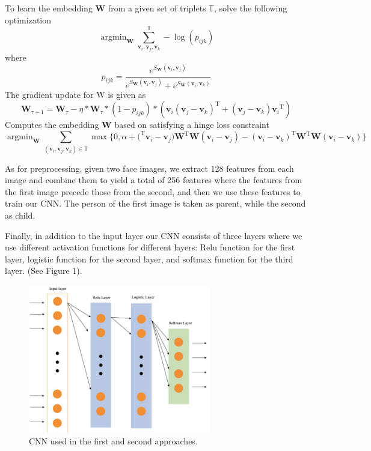 \documentclass{article}
\newcommand{\vect}[1]{\mathbf{#1}}
\newcommand{\argmin}{\mathop{\mathrm{argmin}}}
\newcommand{\trans}[1]{{#1}^\mathrm{T}}
\begin{document}
To learn the embedding $\vect{W}$ from a given set of triplets $\mathbb{T}$, solve the following optimization
\[
\argmin_\vect{W} \sum^\mathbb{T}_{\vect{v}_i, \vect{v}_j, \vect{v}_k} -\log(p_{ijk})
\]
where
\[
p_{ijk} = \frac{e^{S_\vect{W}(\vect{v}_i, \vect{v}_j)}}{e^{S_\vect{W}(\vect{v}_i, \vect{v}_j)} + e^{S_\vect{W}(\vect{v}_i, \vect{v}_k)}}
\]
The gradient update for W is given as
\[
\vect{W}_{\tau + 1} = \vect{W}_\tau - \eta \ast \vect{W}_\tau \ast (1 - p_{ijk}) \ast (\vect{v}_i \trans{(\vect{v}_j - \vect{v}_k)} + (\vect{v}_j - \vect{v}_k) \trans{\vect{v}_i})
\]
Computes the embedding $\vect{W}$ based on satisfying a hinge loss constraint
\[
\argmin_\vect{W} \sum_{(\vect{v}_i, \vect{v}_j, \vect{v}_k) \in \mathbb{T}} \max \{0, \alpha + \trans({\vect{v}_i - \vect{v}_j)} \trans{\vect{W}} \vect{W} (\vect{v}_i - \vect{v}_j) - \trans{(\vect{v}_i - \vect{v}_k)} \trans{\vect{W}} \vect{W} (\vect{v}_i - \vect{v}_k) \}
\]

As for preprocessing, given two face images, we extract 128 features from each image and combine them to yield a total of 256 features where the features from the first image precede those from the second, and then we use these features to train our CNN. The person of the first image is taken as parent, while the second as child.

Finally, in addition to the input layer our CNN consists of three layers where we use different activation functions for different layers: Relu function for the first layer, logistic function for the second layer, and softmax function for the third layer. (See Figure 1).
\begin{figure}[h]
  \centering
  \includegraphics[width=8cm]{CNN_1.png}
  \caption{CNN used in the first and second approaches.}
\end{figure}
\end{document}
